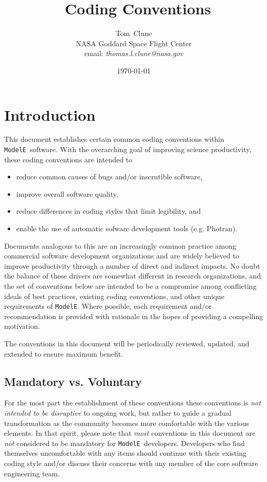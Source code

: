 \documentclass{article}
\title{\ModelE~Coding Conventions}
\author{Tom\ Clune \\
NASA Goddard Space Flight Center \\
email: \emph{thomas.l.clune@nasa.gov}
}
\date{\today}
\newcommand{\ModelE}{{\tt ModelE}}
\begin{document}
\maketitle
\tableofcontents
\section {Introduction}

This document establishes certain common coding conventions within
\ModelE~software.  With the overarching goal of improving science
productivity, these coding conventions are intended to 
\begin{itemize}
\item reduce common causes of bugs and/or inscrutible software,
\item improve overall software quality,
\item reduce differences in coding styles that limit legibility, and
\item enable the use of automatic sofware development tools (e.g. Photran).
\end{itemize}

Documents analogous to this are an increasingly common practice among
commercial software development organizations and are widely believed
to improve productivity through a number of direct and indirect
impacts.  No doubt the balance of these drivers are somewhat different
in research organizations, and the set of conventions below are
intended to be a compromise among conflicting ideals of best
practices, existing coding conventions, and other unique requirements
of \ModelE.  Where possible, each requirement and/or recommendation is
provided with rationale in the hopes of providing a compelling
motivation.

The conventions in this document will be periodically reviewed,
updated, and extended to ensure maximum benefit.

\subsection {Mandatory vs. Voluntary}

For the most part the establishment of these conventions these
conventions is \emph{not intended to be disruptive} to ongoing work, but
rather to guide a gradual transformation as the community becomes more
comfortable with the various elements.  In that spirit, please note
that \emph{most} conventions in this document are \emph{not}
considered to be mandatory for \ModelE~developers.  Developers who find
themselves uncomfortable with any items should continue with their
existing coding style and/or discuss their concerns with any member of
the core software engineering team.   
\end{document}
